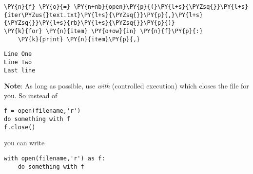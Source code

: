 {\par%
\vspace{-1\baselineskip}%
}%
\begin{notebookcell}[46]%
\begin{addmargin}[\cellleftmargin]{0em}%
{\smaller%
\par%
%
\vspace{-1\smallerfontscale}%
\begin{Verbatim}[commandchars=\\\{\}]
\PY{n}{f} \PY{o}{=} \PY{n+nb}{open}\PY{p}{(}\PY{l+s}{\PYZsq{}}\PY{l+s}{iter\PYZus{}text.txt}\PY{l+s}{\PYZsq{}}\PY{p}{,}\PY{l+s}{\PYZsq{}}\PY{l+s}{rb}\PY{l+s}{\PYZsq{}}\PY{p}{)}
\PY{k}{for} \PY{n}{item} \PY{o+ow}{in} \PY{n}{f}\PY{p}{:}
    \PY{k}{print} \PY{n}{item}\PY{p}{,}
\end{Verbatim}
%
\par%
\vspace{-1\smallerfontscale}}%
\end{addmargin}
\end{notebookcell}

\par\vspace{1\smallerfontscale}%
    \begin{addmargin}[\cellleftmargin]{0em}%
    {\smaller%
    \vspace{-1\smallerfontscale}%
    
    \begin{Verbatim}[commandchars=\\\{\}]
Line One
Line Two
Last line
    \end{Verbatim}
}%
    \end{addmargin}%
    \textbf{Note}: As long as possible, use \emph{with} (controlled
execution) which closes the file for you. So instead of

\begin{verbatim}
f = open(filename,'r')
do something with f
f.close()
\end{verbatim}

you can write

\begin{verbatim}
with open(filename,'r') as f:
    do something with f
    
\end{verbatim}


